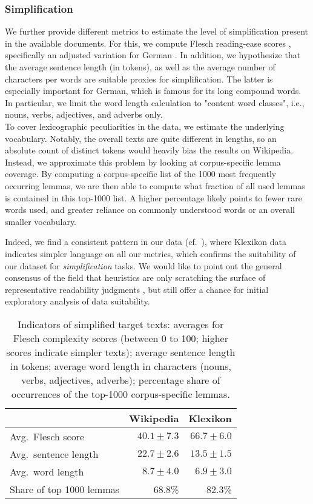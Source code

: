 \documentclass[10pt, a4paper]{article}
\begin{document}
\subsubsection{Simplification}

We further provide different metrics to estimate the level of simplification present in the available documents.
For this, we compute Flesch reading-ease scores \cite{flesch1948new}, specifically an adjusted variation for German \cite{amstad1978verstandlich}.
In addition, we hypothesize that the average sentence length (in tokens), as well as the average number of characters per words are suitable proxies for simplification.
The latter is especially important for German, which is famous for its long compound words. In particular, we limit the word length calculation to "content word classes", i.e., nouns, verbs, adjectives, and adverbs only. \\
To cover lexicographic peculiarities in the data, we estimate the underlying vocabulary.  Notably, the overall texts are quite different in lengths, so an absolute count of distinct tokens would heavily bias the results on Wikipedia.
Instead, we approximate this problem by looking at corpus-specific lemma coverage. By computing a corpus-specific list of the 1000 most frequently occurring lemmas, we are then able to compute what fraction of all used lemmas is contained in this top-1000 list.
A higher percentage likely points to fewer rare words used, and greater reliance on commonly understood words or an overall smaller vocabulary.

Indeed, we find a consistent pattern in our data (cf.~), where Klexikon data indicates simpler language on all our metrics,  which confirms the suitability of our dataset for \emph{simplification} tasks.
We would like to point out the general consensus of the field that heuristics are only scratching the surface of representative readability judgments \cite{chall1958readability}, but still offer a chance for initial exploratory analysis of data suitability.


\begin{table}[t]
	\centering
	\begin{tabular}{lr|r}
		\hline
		\textbf{} & \textbf{Wikipedia} & \textbf{Klexikon} \\
		\hline 
		Avg.~Flesch score & $40.1 \pm 7.3$ & $66.7 \pm 6.0$  \\
		Avg.~sentence length & $22.7 \pm 2.6$ & $13.5 \pm 1.5$ \\
		Avg.~word length & $8.7 \pm 4.0$ & $6.9 \pm 3.0$ \\
		Share of top 1000 lemmas & $68.8$\% & $82.3$\% \\
	\end{tabular}
	\caption{Indicators of simplified target texts: averages for Flesch complexity scores (between 0 to 100; higher scores indicate simpler texts); average sentence length in tokens; average word length in characters (nouns, verbs, adjectives, adverbs); percentage share of occurrences of the top-1000 corpus-specific lemmas.}
	\label{tab:simpler}
\end{table}
\end{document}

